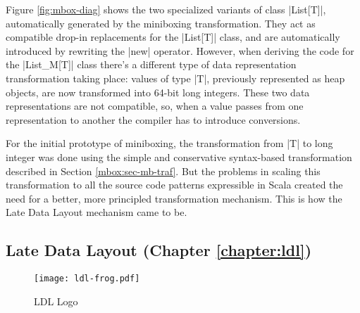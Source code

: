 Figure \ref{fig:mbox-diag} shows the two specialized variants of class |List[T]|, automatically generated by the miniboxing transformation. They act as compatible drop-in replacements for the |List[T]| class, and are automatically introduced by rewriting the |new| operator. However, when deriving the code for the |List_M[T]| class there's a different type of data representation transformation taking place: values of type |T|, previously represented as heap objects, are now transformed into 64-bit long integers. These two data representations are not compatible, so, when a value passes from one representation to another the compiler has to introduce conversions.


For the initial prototype of miniboxing, the transformation from |T| to long integer was done using the simple and conservative syntax-based transformation described in Section \ref{mbox:sec-mb-traf}. But the problems in scaling this transformation to all the source code patterns expressible in Scala created the need for a better, more principled transformation mechanism. This is how the Late Data Layout mechanism came to be.


\subsection{Late Data Layout (Chapter \ref{chapter:ldl})}

\begin{wrapfigure}{r}{40mm}
  \centering
  \vspace{-2em}
  \texttt{[image: ldl-frog.pdf]}
  \vspace{-2em}
  \caption{LDL Logo}
  \vspace{-1em}
\end{wrapfigure}

